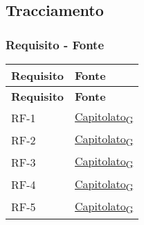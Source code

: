 \subsection{Tracciamento}
\subsubsection{Requisito - Fonte}
\begin{longtable}{|>{\centering\arraybackslash}m{}|>{\centering\arraybackslash}m{}|}
	\hline
	\textbf{Requisito} & \textbf{Fonte}                                                                                                    \\\hline
	\endfirsthead
	\hline
	\textbf{Requisito} & \textbf{Fonte}                                                                                                    \\\hline
	\endhead
	RF-1               & \href{https://7last.github.io/docs/rtb/documentazione-interna/glossario\#capitolato}{Capitolato\textsubscript{G}}                                                                                                        \\\hline
	RF-2               & \href{https://7last.github.io/docs/rtb/documentazione-interna/glossario\#capitolato}{Capitolato\textsubscript{G}}                                                                                                        \\\hline
	RF-3               & \href{https://7last.github.io/docs/rtb/documentazione-interna/glossario\#capitolato}{Capitolato\textsubscript{G}}                                                                                                        \\\hline
	RF-4               & \href{https://7last.github.io/docs/rtb/documentazione-interna/glossario\#capitolato}{Capitolato\textsubscript{G}}                                                                                                        \\\hline
	RF-5               & \href{https://7last.github.io/docs/rtb/documentazione-interna/glossario\#capitolato}{Capitolato\textsubscript{G}}                                                                                                        \\\hline

\end{longtable}

